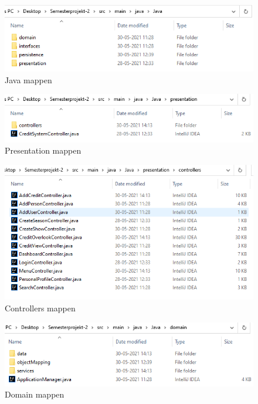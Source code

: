 \begin{figure}[H]
    \centering
    \includegraphics{images/javaBig.PNG}
    \caption{Java mappen}
    \label{fig:my_label}
\end{figure}

\begin{figure}[H]
    \centering
    \includegraphics{images/presentation.PNG}
    \caption{Presentation mappen}
    \label{fig:my_label}
\end{figure}

\begin{figure}[H]
    \centering
    \includegraphics{images/controllers.PNG}
    \caption{Controllers mappen}
    \label{fig:my_label}
\end{figure}

\begin{figure}[H]
    \centering
    \includegraphics{images/domain.PNG}
    \caption{Domain mappen}
    \label{fig:my_label}
\end{figure}

